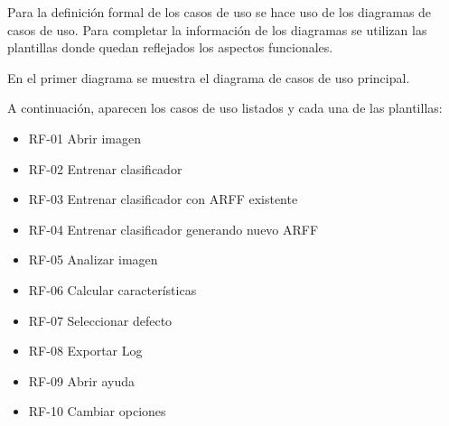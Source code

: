 Para la definición formal de los casos de uso se hace uso de los diagramas de casos de uso. Para completar la información de los diagramas se utilizan las plantillas donde quedan reflejados los aspectos funcionales.

En el primer diagrama  se muestra el diagrama de casos de uso principal.





\newpage
A continuación, aparecen los casos de uso listados y cada una de las plantillas:
\begin{itemize}
 \item RF-01 Abrir imagen 
 \item RF-02 Entrenar clasificador 
 \item RF-03 Entrenar clasificador con ARFF existente 
 \item RF-04 Entrenar clasificador generando nuevo ARFF 
 \item RF-05 Analizar imagen 
 \item RF-06 Calcular características 
 \item RF-07 Seleccionar defecto 
 \item RF-08 Exportar Log 
 \item RF-09 Abrir ayuda 
 \item RF-10 Cambiar opciones 
\end{itemize}

